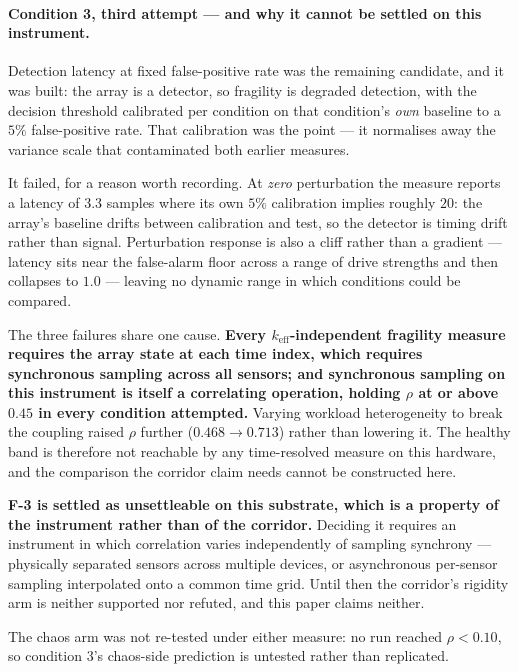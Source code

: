 \documentclass[11pt,a4paper]{article}
\theoremstyle{definition}
\theoremstyle{remark}
\newcommand{\keff}{k_{\text{eff}}}
\begin{document}
\paragraph{Condition 3, third attempt --- and why it cannot be settled on this instrument.}
Detection latency at fixed false-positive rate was the remaining candidate, and it was built:
the array is a detector, so fragility is degraded detection, with the decision threshold
calibrated per condition on that condition's \emph{own} baseline to a $5\%$ false-positive rate.
That calibration was the point --- it normalises away the variance scale that contaminated both
earlier measures.

It failed, for a reason worth recording. At \emph{zero} perturbation the measure reports a
latency of $3.3$ samples where its own $5\%$ calibration implies roughly $20$: the array's
baseline drifts between calibration and test, so the detector is timing drift rather than
signal. Perturbation response is also a cliff rather than a gradient --- latency sits near the
false-alarm floor across a range of drive strengths and then collapses to $1.0$ --- leaving no
dynamic range in which conditions could be compared.

The three failures share one cause. \textbf{Every $\keff$-independent fragility measure requires
the array state at each time index, which requires synchronous sampling across all sensors; and
synchronous sampling on this instrument is itself a correlating operation, holding $\rho$ at or
above $0.45$ in every condition attempted.} Varying workload heterogeneity to break the coupling
raised $\rho$ further ($0.468 \to 0.713$) rather than lowering it. The healthy band is therefore
not reachable by any time-resolved measure on this hardware, and the comparison the corridor
claim needs cannot be constructed here.

\textbf{F-3 is settled as unsettleable on this substrate, which is a property of the instrument
rather than of the corridor.} Deciding it requires an instrument in which correlation varies
independently of sampling synchrony --- physically separated sensors across multiple devices, or
asynchronous per-sensor sampling interpolated onto a common time grid. Until then the corridor's
rigidity arm is neither supported nor refuted, and this paper claims neither.

The chaos arm was not re-tested under either measure: no run reached $\rho < 0.10$, so
condition 3's chaos-side prediction is untested rather than replicated.
\end{document}
